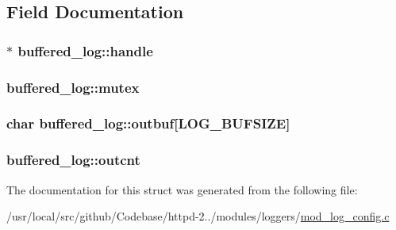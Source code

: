 \subsection{Field Documentation}
\subsubsection[{\texorpdfstring{handle}{handle}}]{$\ast$ buffered\+\_\+log\+::handle}\hypertarget{structbuffered__log_ad832e24fb2ab71c284d2990b97a6261b}{}\label{structbuffered__log_ad832e24fb2ab71c284d2990b97a6261b}
\subsubsection[{\texorpdfstring{mutex}{mutex}}]{ buffered\+\_\+log\+::mutex}\hypertarget{structbuffered__log_ab16638515d5e0d49bdbe6b7b35ce66d1}{}\label{structbuffered__log_ab16638515d5e0d49bdbe6b7b35ce66d1}
\subsubsection[{\texorpdfstring{outbuf}{outbuf}}]{\setlength{\rightskip}{0pt plus 5cm}char buffered\+\_\+log\+::outbuf\mbox{[}{\bf L\+O\+G\+\_\+\+B\+U\+F\+S\+I\+ZE}\mbox{]}}\hypertarget{structbuffered__log_a5051094a6d504ac181c9b8228281b502}{}\label{structbuffered__log_a5051094a6d504ac181c9b8228281b502}
\subsubsection[{\texorpdfstring{outcnt}{outcnt}}]{ buffered\+\_\+log\+::outcnt}\hypertarget{structbuffered__log_aa9b93cc6ac85532dd23ac91172a37725}{}\label{structbuffered__log_aa9b93cc6ac85532dd23ac91172a37725}


The documentation for this struct was generated from the following file\+:\begin{DoxyCompactItemize}
\item 
/usr/local/src/github/\+Codebase/httpd-\/2../modules/loggers/\hyperlink{mod__log__config_8c}{mod\+\_\+log\+\_\+config.\+c}\end{DoxyCompactItemize}
